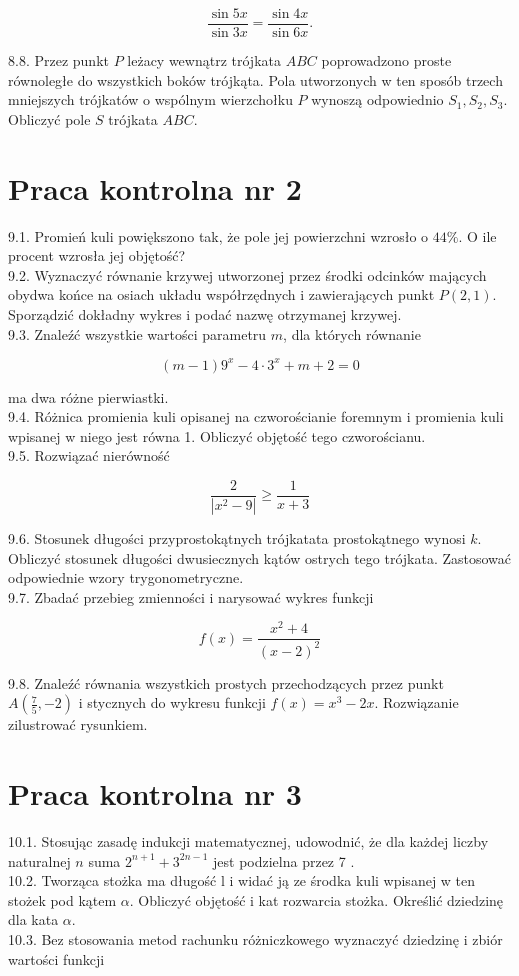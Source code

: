 \documentclass[10pt]{article}
\begin{document}
$$
\frac{\sin 5 x}{\sin 3 x}=\frac{\sin 4 x}{\sin 6 x} .
$$

8.8. Przez punkt $P$ leżacy wewnątrz trójkata $A B C$ poprowadzono proste równoległe do wszystkich boków trójkąta. Pola utworzonych w ten sposób trzech mniejszych trójkatów o wspólnym wierzchołku $P$ wynoszą odpowiednio $S_{1}, S_{2}, S_{3}$. Obliczyć pole $S$ trójkata $A B C$.

\section*{Praca kontrolna nr 2}
9.1. Promień kuli powiększono tak, że pole jej powierzchni wzrosło o $44 \%$. O ile procent wzrosła jej objętość?\\
9.2. Wyznaczyć równanie krzywej utworzonej przez środki odcinków mających obydwa końce na osiach układu współrzędnych i zawierających punkt $P(2,1)$. Sporządzić dokładny wykres i podać nazwę otrzymanej krzywej.\\
9.3. Znaleźć wszystkie wartości parametru $m$, dla których równanie

$$
(m-1) 9^{x}-4 \cdot 3^{x}+m+2=0
$$

ma dwa różne pierwiastki.\\
9.4. Różnica promienia kuli opisanej na czworościanie foremnym i promienia kuli wpisanej w niego jest równa 1. Obliczyć objętość tego czworościanu.\\
9.5. Rozwiązać nierówność

$$
\frac{2}{\left|x^{2}-9\right|} \geq \frac{1}{x+3}
$$

9.6. Stosunek długości przyprostokątnych trójkatata prostokątnego wynosi $k$. Obliczyć stosunek długości dwusiecznych kątów ostrych tego trójkata. Zastosować odpowiednie wzory trygonometryczne.\\
9.7. Zbadać przebieg zmienności i narysować wykres funkcji

$$
f(x)=\frac{x^{2}+4}{(x-2)^{2}}
$$

9.8. Znaleźć równania wszystkich prostych przechodzących przez punkt $A\left(\frac{7}{5},-2\right)$ i stycznych do wykresu funkcji $f(x)=x^{3}-2 x$. Rozwiązanie zilustrować rysunkiem.

\section*{Praca kontrolna nr 3}
10.1. Stosując zasadę indukcji matematycznej, udowodnić, że dla każdej liczby naturalnej $n$ suma $2^{n+1}+3^{2 n-1}$ jest podzielna przez 7 .\\
10.2. Tworząca stożka ma długość l i widać ją ze środka kuli wpisanej w ten stożek pod kątem $\alpha$. Obliczyć objętość i kat rozwarcia stożka. Określić dziedzinę dla kata $\alpha$.\\
10.3. Bez stosowania metod rachunku różniczkowego wyznaczyć dziedzinę i zbiór wartości funkcji
\end{document}

